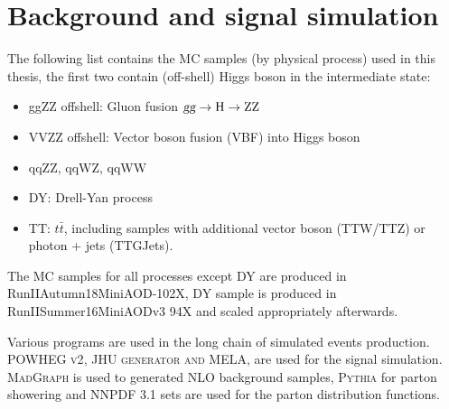 \section{Background and signal simulation}




The following list contains the MC samples (by physical process) used in this thesis, the first two
contain (off-shell) Higgs boson in the intermediate state:
\begin{itemize}
\item ggZZ offshell: Gluon fusion $\textsl{g}\textsl{g} \rightarrow\mathrm{H}\rightarrow\mathrm{ZZ}$
\item VVZZ offshell: Vector boson fusion (VBF) into Higgs boson
\item qqZZ, qqWZ, qqWW
\item DY: Drell-Yan process
\item TT: $t\bar{t}$, including samples with additional vector boson (TTW/TTZ) or photon + jets (TTGJets).
\end{itemize}

The MC samples for all processes except DY are produced in RunIIAutumn18MiniAOD-102X,
DY sample is produced in RunIISummer16MiniAODv3 94X and scaled appropriately afterwards. 

Various programs are used in the long chain of simulated events production.
\textsc{POWHEG v2}\xspace\cite{powhegv2}, \textsc{JHU generator and MELA}\xspace\cite{jhugen}, are used for 
the signal simulation.
\textsc{MadGraph}\xspace\cite{madgraph} is used to generated NLO background samples, 
\textsc{Pythia}\xspace\cite{pythia} for parton
showering and \textsc{NNPDF} 3.1\cite{nnpdf} sets are used for the parton distribution functions.


